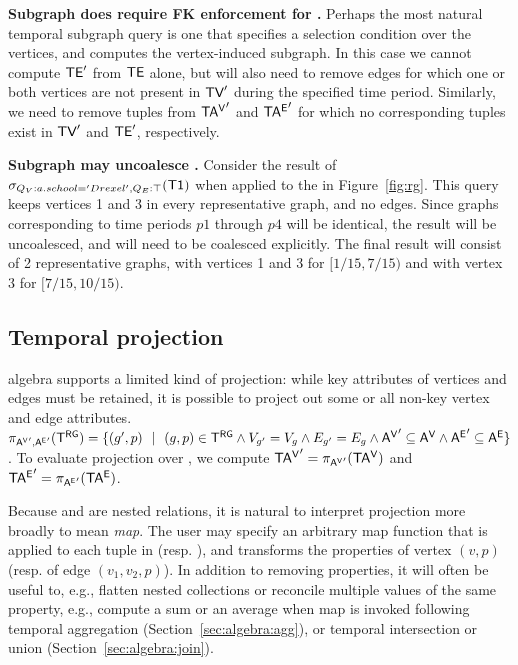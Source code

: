 {\bf Subgraph does require FK enforcement for \tve.}  Perhaps the most
natural temporal subgraph query is one that specifies a selection
condition over the vertices, and computes the vertex-induced subgraph.
In this case we cannot compute $\textsf{TE}'$ from $\textsf{TE}$ alone, but will also
need to remove edges for which one or both vertices are not present in
$\textsf{TV}'$ during the specified time period.  Similarly, we need to remove
tuples from $\mathsf{TA^{V}}'$ and $\mathsf{TA^{E}}'$ for which no corresponding tuples
exist in $\textsf{TV}'$ and $\textsf{TE}'$, respectively.

{\bf Subgraph may uncoalesce \trg.} Consider the result of
$\sigma_{Q_V:{a.school='Drexel'},Q_E:\top} (\textsf{T1})$ when applied
to the \tg in Figure~\ref{fig:rg}.  This query keeps vertices 1 and 3
in every representative graph, and no edges.  Since graphs
corresponding to time periods $p1$ through $p4$ will be identical, the
result will be uncoalesced, and will need to be coalesced explicitly.
The final result will consist of 2 representative graphs, with
vertices 1 and 3 for $[1/15, 7/15)$ and with vertex 3 for $[7/15,
    10/15)$.

\subsection{Temporal projection}%
\label{sec:algebra:project}

\tg algebra supports a limited kind of projection: while key
attributes of vertices and edges must be retained, it is possible to
project out some or all non-key vertex and edge attributes.
$\pi_{\mathsf{A^{V}}',\mathsf{A^{E}}'} (\mathsf{T^{RG}}) = \{ (g', p)~~|~~(g, p) \in \mathsf{T^{RG}} \wedge
V_{g'} = V_{g} \wedge E_{g'} = E_{g} \wedge \mathsf{A^{V}}' \subseteq \mathsf{A^{V}}
\wedge \mathsf{A^{E}}' \subseteq \mathsf{A^{E}} \}$.  To evaluate projection over \tve, we
compute $\mathsf{TA^{V}}' = \pi_{\mathsf{A^{V}}'} (\mathsf{TA^{V}})$ and $\mathsf{TA^{E}}' = \pi_{\mathsf{A^{E}}'} (\mathsf{TA^{E}})$.

Because \avv and \aee are nested relations, it is natural to interpret
projection more broadly to mean {\em map}.  The user may specify an
arbitrary map function that is applied to each tuple in \avv
(resp. \aee), and transforms the properties of vertex $(v,p)$
(resp. of edge $(v_1,v_2,p)$).  In addition to removing properties, it
will often be useful to, e.g., flatten nested collections or reconcile
multiple values of the same property, e.g., compute a sum or an
average when map is invoked following temporal aggregation
(Section~\ref{sec:algebra:agg}), or temporal intersection or union
(Section~\ref{sec:algebra:join}).

